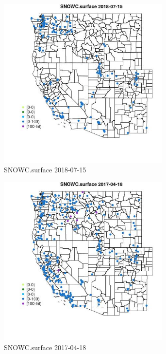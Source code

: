 \begin{figure} 
\centering  
\includegraphics[width=0.77\textwidth]{Code_Outputs/Report_ML_input_PM25_Step4_part_e_de_duplicated_aves_compiled_2019-05-21wNAs_MapObsSNOWCsurface2018-07-15.jpg} 
\caption{\label{fig:Report_ML_input_PM25_Step4_part_e_de_duplicated_aves_compiled_2019-05-21wNAsMapObsSNOWCsurface2018-07-15}SNOWC.surface 2018-07-15} 
\end{figure} 
 

\begin{figure} 
\centering  
\includegraphics[width=0.77\textwidth]{Code_Outputs/Report_ML_input_PM25_Step4_part_e_de_duplicated_aves_compiled_2019-05-21wNAs_MapObsSNOWCsurface2017-04-18.jpg} 
\caption{\label{fig:Report_ML_input_PM25_Step4_part_e_de_duplicated_aves_compiled_2019-05-21wNAsMapObsSNOWCsurface2017-04-18}SNOWC.surface 2017-04-18} 
\end{figure} 
 

